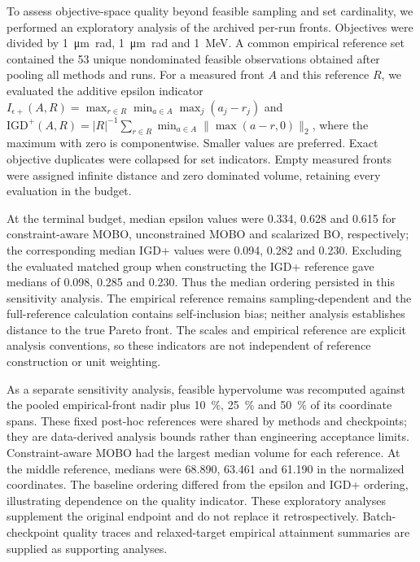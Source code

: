 To assess objective-space quality beyond feasible sampling and set cardinality, we performed
an exploratory analysis of the archived per-run fronts. Objectives were divided by
\SI{1}{\micro\metre\radian}, \SI{1}{\micro\metre\radian} and \SI{1}{\mega\electronvolt}.
A common empirical reference set contained the 53 unique nondominated feasible observations
obtained after pooling all methods and runs. For a measured front $A$ and this reference $R$,
we evaluated the additive epsilon indicator
$I_{\epsilon+}(A,R)=\max_{r\in R}\min_{a\in A}\max_j(a_j-r_j)$ and
$\mathrm{IGD}^{+}(A,R)=|R|^{-1}\sum_{r\in R}\min_{a\in A}\|\max(a-r,0)\|_2$,
where the maximum with zero is componentwise. Smaller values are preferred. Exact objective
duplicates were collapsed for set indicators. Empty measured fronts were assigned infinite
distance and zero dominated volume, retaining every evaluation in the budget.

At the terminal budget, median epsilon values were 0.334, 0.628 and 0.615 for constraint-aware
MOBO, unconstrained MOBO and scalarized BO, respectively; the corresponding median IGD+
values were 0.094, 0.282 and 0.230. Excluding the evaluated matched group when constructing
the IGD+ reference gave medians of 0.098, 0.285 and 0.230. Thus the median ordering persisted
in this sensitivity analysis. The empirical reference remains sampling-dependent and the
full-reference calculation contains self-inclusion bias; neither analysis establishes distance
to the true Pareto front. The scales and empirical reference are explicit analysis conventions,
so these indicators are not independent of reference construction or unit weighting.

As a separate sensitivity analysis, feasible hypervolume was recomputed against the pooled
empirical-front nadir plus \SI{10}{\percent}, \SI{25}{\percent} and \SI{50}{\percent} of its
coordinate spans. These fixed post-hoc references were shared by methods and checkpoints;
they are data-derived analysis bounds rather than engineering acceptance limits.
Constraint-aware MOBO had the largest median volume for each reference. At the middle
reference, medians were 68.890, 63.461 and 61.190 in the normalized coordinates. The baseline
ordering differed from the epsilon and IGD+ ordering, illustrating dependence on the quality
indicator. These exploratory analyses supplement the original endpoint and do not replace it
retrospectively. Batch-checkpoint quality traces and relaxed-target empirical attainment
summaries are supplied as supporting analyses.
